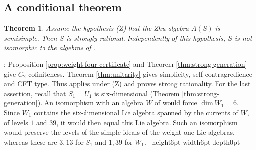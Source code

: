 \documentclass[leqno]{article}
\newcommand{\qed}{\hfill \vrule height6pt  width6pt depth0pt}
\newtheorem{thm}{Theorem}[section]
\newenvironment{proof}[1][]{\noindent {\it Proof #1} : }{\hbox{~}\qed
\smallskip
}
\numberwithin{equation}{section}
\begin{document}
\subsection{A conditional theorem}
\label{subsec:conditional}

\begin{thm}
\label{thm:conditional}
Assume the hypothesis \textup{(Z)} that the Zhu algebra $A(S)$ is semisimple. Then $S$ is strongly rational. Independently of this hypothesis, $S$ is not isomorphic to the algebras of \cite{Rie26,Hua26}.
\end{thm}

\begin{proof}
Proposition \ref{prop:weight-four-certificate} and Theorem \ref{thm:strong-generation} give $C_2$-cofiniteness. Theorem \ref{thm:unitarity} gives simplicity, self-contragredience and CFT type. Thus \cite[Main Theorem 3 (Corollary 5.19)]{McR21} applies under \textup{(Z)} and proves strong rationality. For the last assertion, recall that $S_1 = U_1$ is six-dimensional (Theorem \ref{thm:strong-generation}). An isomorphism with an algebra $W$ of \cite{Rie26,Hua26} would force $\dim W_1 = 6$. Since $W_1$ contains the six-dimensional Lie algebra spanned by the currents of $W$, of levels $1$ and $39$, it would then equal this Lie algebra. Such an isomorphism would preserve the levels of the simple ideals of the weight-one Lie algebras, whereas these are $3,13$ for $S_1$ and $1,39$ for $W_1$.
\end{proof}
\end{document}
